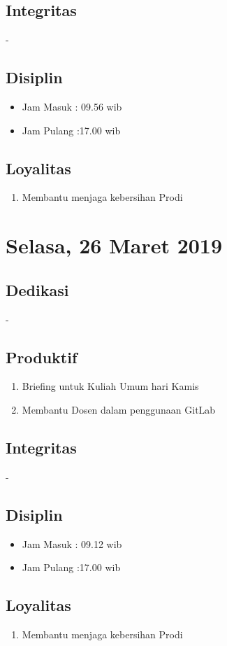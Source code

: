 \subsection{Integritas}
-
\subsection{Disiplin}
\begin{itemize}
\item Jam Masuk : 09.56 wib
\item Jam Pulang :17.00 wib
\end{itemize}
\subsection{Loyalitas}
\begin{enumerate}
\item Membantu menjaga kebersihan Prodi
\end{enumerate}

\section{Selasa, 26 Maret 2019}
\subsection{Dedikasi}
-
\subsection{Produktif}
\begin{enumerate}
\item Briefing untuk Kuliah Umum hari Kamis
\item Membantu Dosen dalam penggunaan GitLab
\end{enumerate}
\subsection{Integritas}
-
\subsection{Disiplin}
\begin{itemize}
\item Jam Masuk : 09.12 wib
\item Jam Pulang :17.00 wib
\end{itemize}
\subsection{Loyalitas}
\begin{enumerate}
\item Membantu menjaga kebersihan Prodi
\end{enumerate}

